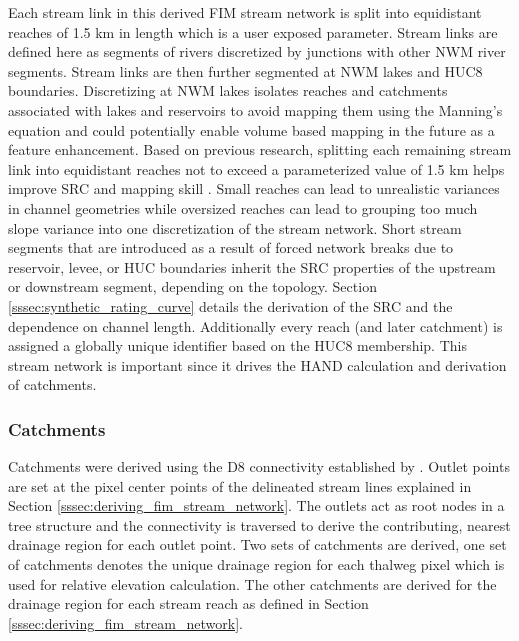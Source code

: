 \documentclass[draft]{dependencies/agujournal2019}
\begin{document}
Each stream link in this derived FIM stream network is split into equidistant reaches of 1.5 km in length which is a user exposed parameter.
Stream links are defined here as segments of rivers discretized by junctions with other NWM river segments.
Stream links are then further segmented at NWM lakes and HUC8 boundaries.
Discretizing at NWM lakes isolates reaches and catchments associated with lakes and reservoirs to avoid mapping them using the Manning's equation and could potentially enable volume based mapping in the future as a feature enhancement.
Based on previous research, splitting each remaining stream link into equidistant reaches not to exceed a parameterized value of 1.5 km helps improve SRC and mapping skill \cite{garousi2019terrain,godbout2019error,zheng2018geoflood}.
Small reaches can lead to unrealistic variances in channel geometries while oversized reaches can lead to grouping too much slope variance into one discretization of the stream network.
Short stream segments that are introduced as a result of forced network breaks due to reservoir, levee, or HUC boundaries inherit the SRC properties of the upstream or downstream segment, depending on the topology.
Section \ref{sssec:synthetic_rating_curve} details the derivation of the SRC and the dependence on channel length. 
Additionally every reach (and later catchment) is assigned a globally unique identifier based on the HUC8 membership.
This stream network is important since it drives the HAND calculation and derivation of catchments.
%
\subsubsection{Catchments}
\label{sssec:catchments}
%
Catchments were derived using the D8 connectivity established by .
Outlet points are set at the pixel center points of the delineated stream lines explained in Section \ref{sssec:deriving_fim_stream_network}.
The outlets act as root nodes in a tree structure and the connectivity is traversed to derive the contributing, nearest drainage region for each outlet point.
Two sets of catchments are derived, one set of catchments denotes the unique drainage region for each thalweg pixel which is used for relative elevation calculation.
The other catchments are derived for the drainage region for each stream reach as defined in Section \ref{sssec:deriving_fim_stream_network}. 
%
\end{document}
